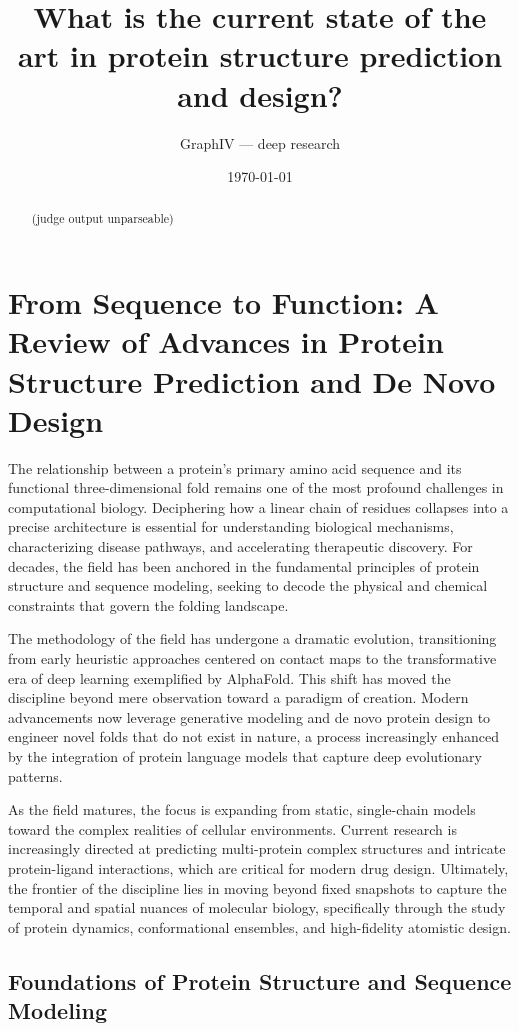 \documentclass[11pt]{article}
\title{What is the current state of the art in protein structure prediction and design?}
\author{GraphIV --- deep research}
\date{\today}
\begin{document}
\maketitle

\begin{abstract}
(judge output unparseable)
\end{abstract}

\section{From Sequence to Function: A Review of Advances in Protein Structure Prediction and De Novo Design}

The relationship between a protein's primary amino acid sequence and its functional three-dimensional fold remains one of the most profound challenges in computational biology. Deciphering how a linear chain of residues collapses into a precise architecture is essential for understanding biological mechanisms, characterizing disease pathways, and accelerating therapeutic discovery. For decades, the field has been anchored in the fundamental principles of protein structure and sequence modeling, seeking to decode the physical and chemical constraints that govern the folding landscape.

The methodology of the field has undergone a dramatic evolution, transitioning from early heuristic approaches centered on contact maps to the transformative era of deep learning exemplified by AlphaFold. This shift has moved the discipline beyond mere observation toward a paradigm of creation. Modern advancements now leverage generative modeling and de novo protein design to engineer novel folds that do not exist in nature, a process increasingly enhanced by the integration of protein language models that capture deep evolutionary patterns.

As the field matures, the focus is expanding from static, single-chain models toward the complex realities of cellular environments. Current research is increasingly directed at predicting multi-protein complex structures and intricate protein-ligand interactions, which are critical for modern drug design. Ultimately, the frontier of the discipline lies in moving beyond fixed snapshots to capture the temporal and spatial nuances of molecular biology, specifically through the study of protein dynamics, conformational ensembles, and high-fidelity atomistic design.

\subsection{Foundations of Protein Structure and Sequence Modeling}
\end{document}
